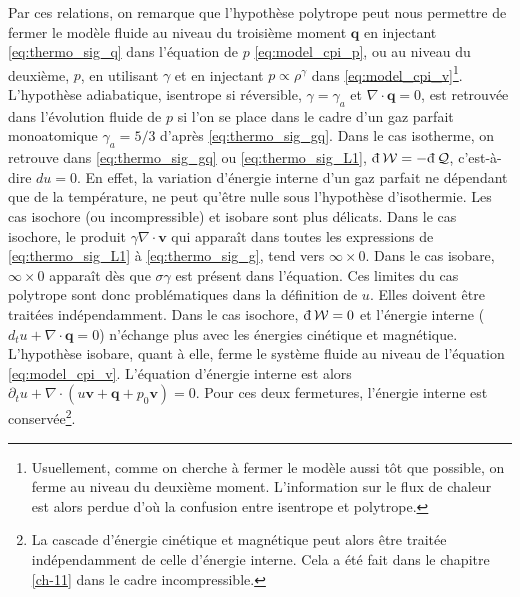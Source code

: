 Par ces relations, on remarque que l'hypothèse polytrope peut nous permettre de fermer le modèle fluide au niveau du troisième moment $\boldsymbol{q}$ en injectant \eqref{eq:thermo_sig_q} dans l'équation de $p$ \eqref{eq:model_cpi_p}, ou au niveau du deuxième, $p$, en utilisant $\gamma$ et en injectant $p \propto \rho^{\gamma}$ dans \eqref{eq:model_cpi_v}\footnote{Usuellement, comme on cherche à fermer le modèle aussi tôt que possible, on ferme au niveau du deuxième moment. L'information sur le flux de chaleur est alors perdue d'où la confusion entre isentrope et polytrope.}. L'hypothèse adiabatique, isentrope si réversible, $\gamma=\gamma_a$ et $\nabla \cdot \boldsymbol{q}=0$, est retrouvée dans l'évolution fluide de $p$ si l'on se place dans le cadre d'un gaz parfait monoatomique $\gamma_a = 5/3$ d'après \eqref{eq:thermo_sig_gq}. Dans le cas isotherme, on retrouve dans \eqref{eq:thermo_sig_gq} ou \eqref{eq:thermo_sig_L1}, $\dj \mathcal{W} = - \dj \mathcal{Q}$, c'est-à-dire $du = 0$. En effet, la variation d'énergie interne d'un gaz parfait ne dépendant que de la température, ne peut qu'être nulle sous l'hypothèse d'isothermie. Les cas isochore (ou incompressible) et isobare sont plus délicats. Dans le cas isochore, le produit $\gamma \nabla \cdot \boldsymbol{v}$ qui apparaît dans toutes les expressions de \eqref{eq:thermo_sig_L1} à \eqref{eq:thermo_sig_g}, tend vers $\infty \times 0$. Dans le cas isobare, $\infty \times 0$ apparaît dès que $\sigma \gamma$ est présent dans l'équation. Ces limites du cas polytrope sont donc problématiques dans la définition de $u$. Elles doivent être traitées indépendamment. Dans le cas isochore, $\dj \mathcal{W} = 0$ et l'énergie interne ($d_t u + \nabla \cdot \boldsymbol{q} = 0 $) n'échange plus avec les énergies cinétique et magnétique. L'hypothèse isobare, quant à elle, ferme le système fluide au niveau de l'équation \eqref{eq:model_cpi_v}. L'équation d'énergie interne est alors  $\partial_t u + \nabla \cdot \left(u \boldsymbol{v} + \boldsymbol{q} + p_0 \boldsymbol{v}\right) = 0 $. Pour ces deux fermetures, l'énergie interne est conservée\footnote{La cascade d'énergie cinétique et magnétique peut alors être traitée indépendamment de celle d'énergie interne.  Cela a été fait dans le chapitre \ref{ch-11} dans le cadre incompressible.}.

